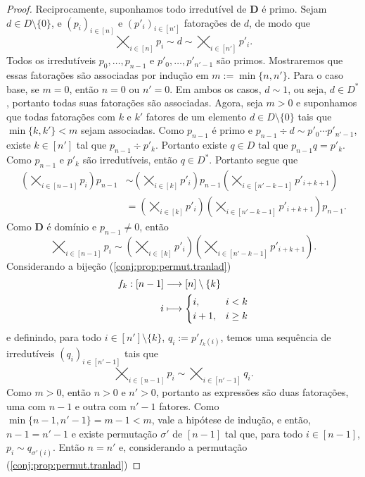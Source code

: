 \begin{proof}
Reciprocamente, suponhamos todo irredutível de $\bm D$ é primo. Sejam $d \in D \setminus \{0\}$, e $(p_i)_{i \in [n]}$ e $(p'_i)_{i \in [n']}$ fatorações de $d$, de modo que
	\begin{equation*}
	\bigtimes_{i \in [n]} p_i \sim d \sim \bigtimes_{i \in [n']} p'_i.
	\end{equation*}
Todos os irredutíveis $p_0,\ldots,p_{n-1}$ e $p'_0,\ldots,p'_{n'-1}$ são primos. Mostraremos que essas fatorações são associadas por indução em $m := \min\{n,n'\}$. Para o caso base, se $m=0$, então $n=0$ ou $n'=0$. Em ambos os casos, $d \sim 1$, ou seja, $d \in D^*$, portanto todas suas fatorações são associadas. Agora, seja $m > 0$ e suponhamos que todas fatorações com $k$ e $k'$ fatores de um elemento $d \in D \setminus \{0\}$ tais que $\min\{k,k'\}<m$ sejam associadas. Como $p_{n-1}$ é primo  e $p_{n-1} \div d \sim p'_0 \cdots p'_{n'-1}$, existe $k \in [n']$ tal que $p_{n-1} \div p'_k$. Portanto existe $q \in D$ tal que $p_{n-1}q = p'_k$. Como $p_{n-1}$ e $p'_k$ são irredutíveis, então $q \in D^*$. Portanto segue que
	\begin{align*}
	\left( \bigtimes_{i \in [n-1]} p_i \right) p_{n-1} &\sim \left( \bigtimes_{i \in [k]} p'_i \right) p_{n-1} \left( \bigtimes_{i \in [n'-k-1]} p'_{i+k+1} \right) \\
		&= \left( \bigtimes_{i \in [k]} p'_i \right)\left( \bigtimes_{i \in [n'-k-1]} p'_{i+k+1} \right) p_{n-1}.
	\end{align*}
Como $\bm D$ é domínio e $p_{n-1} \neq 0$, então
	\begin{equation*}
	\bigtimes_{i \in [n-1]} p_i \sim \left( \bigtimes_{i \in [k]} p'_i \right) \left( \bigtimes_{i \in [n'-k-1]} p'_{i+k+1} \right).
	\end{equation*}
Considerando a bijeção (\ref{conj:prop:permut.tranlad})
	\begin{align*}
	{f_k}: {[n-1]} &\longrightarrow {[n]\setminus\{k\}} \\{i} &\longmapsto {\begin{cases}
		i,& i < k \\
		i+1,& i \geq k
		\end{cases}}
	\end{align*}
 e definindo, para todo $i \in [n'] \setminus \{k\}$, $q_i := p'_{f_k(i)}$, temos uma sequência de irredutíveis $(q_i)_{i \in [n'-1]}$ tais que
	\begin{equation*}
	\bigtimes_{i \in [n-1]} p_i \sim \bigtimes_{i \in [n'-1]} q_i.
	\end{equation*}
Como $m>0$, então $n>0$ e $n'>0$, portanto as expressões são duas fatorações, uma com $n-1$ e outra com $n'-1$ fatores. Como $\min\{n-1,n'-1\} = m-1 < m$, vale a hipótese de indução, e então, $n-1=n'-1$ e existe permutação $\sigma'$ de $[n-1]$ tal que, para todo $i \in [n-1]$, $p_i \sim q_{\sigma'(i)}$. Então  $n=n'$ e, considerando a permutação (\ref{conj:prop:permut.tranlad})

\end{proof}
